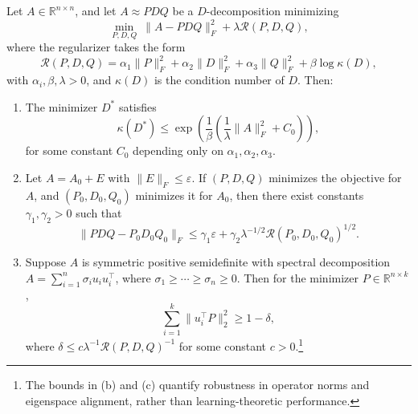 \documentclass[10pt,a4paper]{amsart}
\begin{document}
\begin{theorem}
\label{thm:triple}
Let \( A \in \mathbb{R}^{n \times n} \), and let \( A \approx P D Q \) be a \( D \)-decomposition minimizing
\[
\min_{P, D, Q} \ \|A - P D Q\|_F^2 + \lambda \mathcal{R}(P, D, Q),
\]
where the regularizer takes the form
\[
\mathcal{R}(P, D, Q) = \alpha_1 \|P\|_F^2 + \alpha_2 \|D\|_F^2 + \alpha_3 \|Q\|_F^2 + \beta \log \kappa(D),
\]
with \( \alpha_i, \beta, \lambda > 0 \), and \( \kappa(D) \) is the condition number of \( D \). Then:
\begin{enumerate}
    \item[\textbf{(a)}] The minimizer \( D^* \) satisfies
    \[
    \kappa(D^*) \leq \exp\left( \frac{1}{\beta} \left( \frac{1}{\lambda} \|A\|_F^2 + C_0 \right) \right),
    \]
    for some constant \( C_0 \) depending only on \( \alpha_1, \alpha_2, \alpha_3 \).
    
    \item[\textbf{(b)}] Let \( A = A_0 + E \) with \( \|E\|_F \leq \varepsilon \). If \( (P, D, Q) \) minimizes the objective for \( A \), and \( (P_0, D_0, Q_0) \) minimizes it for \( A_0 \), then there exist constants \( \gamma_1, \gamma_2 > 0 \) such that
    \[
    \|P D Q - P_0 D_0 Q_0\|_F \leq \gamma_1 \varepsilon + \gamma_2 \lambda^{-1/2} \mathcal{R}(P_0, D_0, Q_0)^{1/2}.
    \]
    
    \item[\textbf{(c)}] Suppose \( A \) is symmetric positive semidefinite with spectral decomposition \( A = \sum_{i=1}^n \sigma_i u_i u_i^\top \), where \( \sigma_1 \geq \cdots \geq \sigma_n \geq 0 \). Then for the minimizer \( P \in \mathbb{R}^{n \times k} \),
    \[
    \sum_{i=1}^k \|u_i^\top P\|_2^2 \geq 1 - \delta,
    \]
    where \( \delta \leq c \lambda^{-1} \mathcal{R}(P, D, Q)^{-1} \) for some constant \( c > 0 \).\footnote{The bounds in (b) and (c) quantify robustness in operator norms and eigenspace alignment, rather than learning-theoretic performance.}
\end{enumerate}
\end{theorem}
\end{document}
